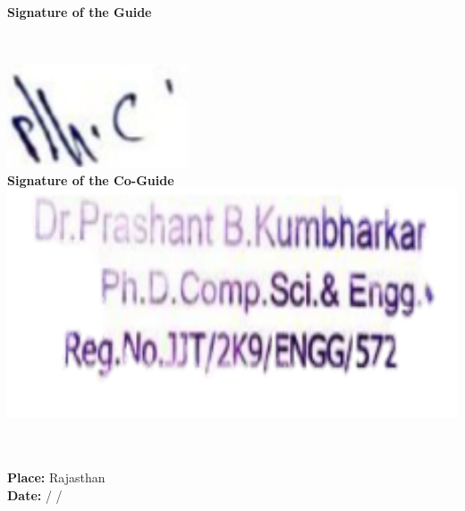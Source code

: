 \begin{titlepage}
\begin{left}
\begin{minipage}{0.5\textwidth}
\begin{flushright}
\\[1.5cm]
\textbf{Signature of the Guide} \\
\end{flushright}
\end{minipage}
\\[1.5cm]

\begin{minipage}{0.5\textwidth}
\begin{flushleft} 

\includegraphics[width=0.4\textwidth]{images/coguide_signature.png}\\
\textbf{Signature of the Co-Guide}\\
\includegraphics[width=1\textwidth]{images/coguidestamp.png}\\
\end{flushleft}
\end{minipage}
\\\\
\textbf{Place:} Rajasthan\\
\textbf{Date:}\hspace{0.5cm} /       \hspace{0.5cm}/

\end{left}
\end{titlepage}